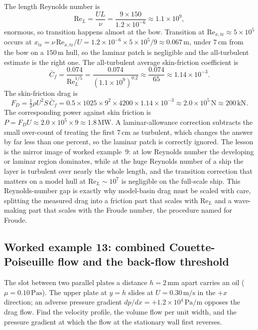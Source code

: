 The length Reynolds number is
\[
\text{Re}_L = \frac{U L}{\nu} = \frac{9\times150}{1.2\times10^{-6}}
\approx 1.1\times10^{9},
\]
enormous, so transition happens almost at the bow. Transition at
$\text{Re}_{x,\text{tr}}\approx5\times10^5$ occurs at
$x_{\text{tr}} = \nu\,\text{Re}_{x,\text{tr}}/U = 1.2\times10^{-6}
\times5\times10^5/9 \approx 0.067\,\si{\meter}$, under $7\,\si{\centi
\meter}$ from the bow on a $150\,\si{\meter}$ hull, so the laminar
patch is negligible and the all-turbulent estimate is the right one.
The all-turbulent average skin-friction coefficient is
\[
\bar C_f = \frac{0.074}{\text{Re}_L^{1/5}} = \frac{0.074}{(1.1\times
10^{9})^{0.2}} \approx \frac{0.074}{65} \approx 1.14\times10^{-3}.
\]
The skin-friction drag is
\[
F_D = \tfrac12\rho U^2 S\,\bar C_f = 0.5\times1025\times9^2\times4200
\times1.14\times10^{-3} \approx 2.0\times10^{5}\,\si{\newton}
\approx 200\,\text{kN}.
\]
The corresponding power against skin friction is $P = F_D U \approx
2.0\times10^5\times9 \approx 1.8\,\text{MW}$. A laminar-allowance
correction subtracts the small over-count of treating the first
$7\,\si{\centi\meter}$ as turbulent, which changes the answer by far
less than one percent, so the laminar patch is correctly ignored.
The lesson is the mirror image of worked example~9: at low Reynolds
number the developing or laminar region dominates, while at the huge
Reynolds number of a ship the layer is turbulent over nearly the
whole length, and the transition correction that matters on a model
hull at $\text{Re}_L\sim10^7$ is negligible on the full-scale ship.
This Reynolds-number gap is exactly why model-basin drag must be
scaled with care, splitting the measured drag into a friction part
that scales with $\text{Re}_L$ and a wave-making part that scales with
the Froude number, the procedure named for Froude.

\subsection*{Worked example 13: combined Couette-Poiseuille flow and the back-flow threshold}

The slot between two parallel plates a distance $h = 2\,\si{\milli
\meter}$ apart carries an oil ($\mu = 0.10\,\si{\pascal\second}$).
The upper plate at $y = h$ slides at $U = 0.30\,\si{\meter\per
\second}$ in the $+x$ direction; an adverse pressure gradient
$dp/dx = +1.2\times10^{4}\,\si{\pascal\per\meter}$ opposes the
drag flow. Find the velocity profile, the volume flow per unit
width, and the pressure gradient at which the flow at the
stationary wall first reverses.

